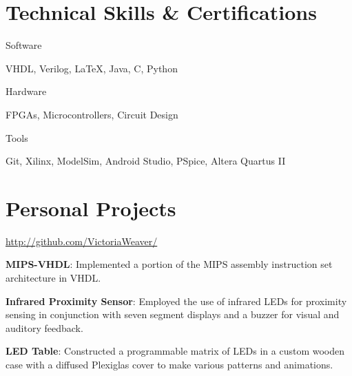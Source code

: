 \documentclass[a4paper,margin,line]{resume}
\begin{document}
\begin{resume}
\section{\mysidestyle Technical Skills \& Certifications}
    \begin{compactdesc}
        \item[Software] \begin{inparaenum} { \small
            VHDL,
            Verilog,
            \LaTeX,
            Java,
            C,
            Python
        } \end{inparaenum}
        \item[Hardware] \begin{inparaenum} { \small
            FPGAs, Microcontrollers, Circuit Design
       } \end{inparaenum}
        \item[Tools] \begin{inparaenum} { \small
            Git,
            Xilinx,
            ModelSim,
            Android Studio,
            PSpice,
            Altera Quartus II
        } \end{inparaenum}
    \end{compactdesc}

\section{\mysidestyle Personal Projects}
    \begin{asparablank}
        \item \href{http://github.com/VictoriaWeaver/}{http://github.com/VictoriaWeaver/}\\
        \item \textbf{MIPS-VHDL}: Implemented a portion of the MIPS assembly instruction set 
            architecture in VHDL.\\
        \item \textbf{Infrared Proximity Sensor}: Employed the use of infrared LEDs for proximity 
            sensing in conjunction with seven segment displays and a buzzer for visual and auditory 
            feedback.\\
        \item \textbf{LED Table}: Constructed a programmable matrix of LEDs in a custom wooden 
            case with a diffused Plexiglas cover to make various patterns and animations.\\
    \end{asparablank}
    

\end{resume}
\end{document}
